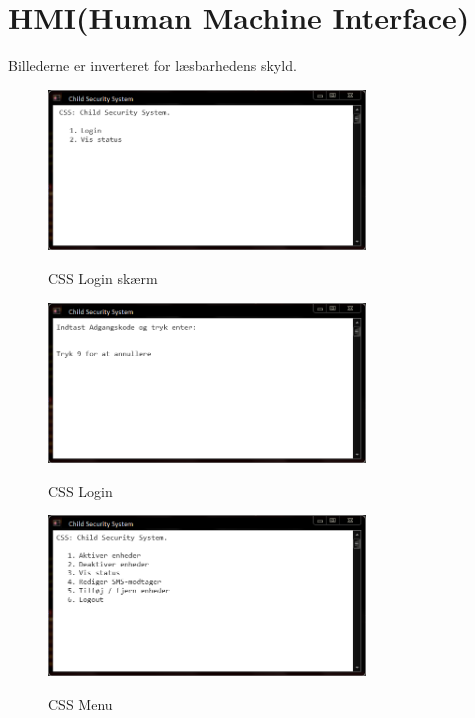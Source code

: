 \newpage
\section{HMI(Human Machine Interface)}

Billederne er inverteret for læsbarhedens skyld.

\begin{figure}[H] \centering
{\includegraphics[width=0.75\textwidth]{billeder/cmdprompt/CSS_pre_login_menu}}
\caption{CSS Login skærm}
\end{figure}

\begin{figure}[H] \centering
{\includegraphics[width=0.75\textwidth]{billeder/cmdprompt/CSS_login}}
\caption{CSS Login}
\end{figure}

\begin{figure}[H] \centering
{\includegraphics[width=0.75\textwidth]{billeder/cmdprompt/CSS_menu}}
\caption{CSS Menu}
\end{figure}

